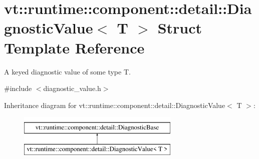 \hypertarget{structvt_1_1runtime_1_1component_1_1detail_1_1_diagnostic_value}{}\section{vt\+:\+:runtime\+:\+:component\+:\+:detail\+:\+:Diagnostic\+Value$<$ T $>$ Struct Template Reference}
\label{structvt_1_1runtime_1_1component_1_1detail_1_1_diagnostic_value}


A keyed diagnostic value of some type {\ttfamily T}.  




{\ttfamily \#include $<$diagnostic\+\_\+value.\+h$>$}

Inheritance diagram for vt\+:\+:runtime\+:\+:component\+:\+:detail\+:\+:Diagnostic\+Value$<$ T $>$\+:\begin{figure}[H]
\begin{center}
\leavevmode
\includegraphics[height=2.000000cm]{structvt_1_1runtime_1_1component_1_1detail_1_1_diagnostic_value}
\end{center}
\end{figure}
